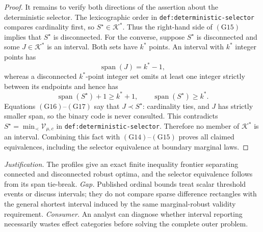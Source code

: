 \documentclass{article}
\begin{document}
\begin{proof}
It remains to verify both directions of the assertion about the deterministic selector.  The lexicographic order in \texttt{def:deterministic-selector} compares cardinality first, so \(S^\star\in\mathcal K^*\).  Thus the right-hand side of \((\mathrm{G15})\) implies that \(S^\star\) is disconnected.  For the converse, suppose \(S^\star\) is disconnected and some \(J\in\mathcal K^*\) is an interval.  Both sets have \(k^*\) points.  An interval with \(k^*\) integer points has
\[
\operatorname{span}(J)=k^*-1,
\tag{G16}
\]
whereas a disconnected \(k^*\)-point integer set omits at least one integer strictly between its endpoints and hence has
\[
\operatorname{span}(S^\star)+1\geq k^*+1,
\qquad
\operatorname{span}(S^\star)\geq k^*.
\tag{G17}
\]
Equations \((\mathrm{G16})\)--\((\mathrm{G17})\) say that \(J\prec S^\star\): cardinality ties, and \(J\) has strictly smaller span, so the binary code is never consulted.  This contradicts \(S^\star=\min_\prec\mathcal V_{\mu,c}\) in \texttt{def:deterministic-selector}.  Therefore no member of \(\mathcal K^*\) is an interval.  Combining this fact with \((\mathrm{G14})\)--\((\mathrm{G15})\) proves all claimed equivalences, including the selector equivalence at boundary marginal laws.
\end{proof}
\par\smallskip\noindent \textit{Justification.} The profiles give an exact finite inequality frontier separating connected and disconnected robust optima, and the selector equivalence follows from its span tie-break. \textit{Gap.} Published ordinal bounds treat scalar threshold events or discuss intervals; they do not compare sparse difference rectangles with the general shortest interval induced by the same marginal-robust validity requirement. \textit{Consumer.} An analyst can diagnose whether interval reporting necessarily wastes effect categories before solving the complete outer problem.
\end{document}

